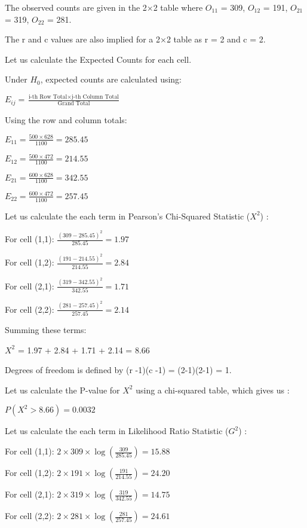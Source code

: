 \documentclass[
]{article}
\begin{document}
The observed counts are given in the 2×2 table where \({O_{11}}\) = 309,
\({O_{12}}\) = 191, \({O_{21}}\) = 319, \({O_{22}}\) = 281.

The r and c values are also implied for a 2×2 table as r = 2 and c = 2.

Let us calculate the Expected Counts for each cell.

Under \({H_0}\), expected counts are calculated using:

\({E_{ij} = \frac{\text{i-th Row Total} \times \text{j-th Column Total}}{\text{Grand Total}}}\)

Using the row and column totals:

\({E_{11} = \frac{500 \times 628}{1100} = 285.45}\)

\({E_{12} = \frac{500 \times 472}{1100} = 214.55}\)

\({E_{21} = \frac{600 \times 628}{1100} = 342.55}\)

\({E_{22} = \frac{600 \times 472}{1100} = 257.45}\)

Let us calculate the each term in Pearson's Chi-Squared Statistic
(\({X^2}\)) :

For cell (1,1): \({\frac{(309 - 285.45)^2}{285.45} = 1.97}\)

For cell (1,2): \({\frac{(191 - 214.55)^2}{214.55} = 2.84}\)

For cell (2,1): \({\frac{(319 - 342.55)^2}{342.55} = 1.71}\)

For cell (2,2): \({\frac{(281 - 257.45)^2}{257.45} = 2.14}\)

Summing these terms:

\({X^2}\) = 1.97 + 2.84 + 1.71 + 2.14 = 8.66

Degrees of freedom is defined by (r -1)(c -1) = (2-1)(2-1) = 1.

Let us calculate the P-value for \({X^2}\) using a chi-squared table,
which gives us :

\({P(X^2 > 8.66) = 0.0032}\)

Let us calculate the each term in Likelihood Ratio Statistic (\({G^2}\))
:

For cell (1,1):
\({2 \times 309 \times \log\left(\frac{309}{285.45}\right) = 15.88}\)

For cell (1,2):
\({2 \times 191 \times \log\left(\frac{191}{214.55}\right) = 24.20}\)

For cell (2,1):
\({2 \times 319 \times \log\left(\frac{319}{342.55}\right) = 14.75}\)

For cell (2,2):
\({2 \times 281 \times \log\left(\frac{281}{257.45}\right) = 24.61}\)
\end{document}
